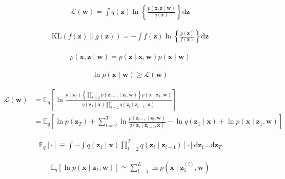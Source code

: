 \documentclass{article}
\begin{document}
\begin{align*}
\mathcal{L}(\mathbf{w})=\int q(\mathbf{z}) \ln \left\{\frac{p(\mathbf{x}, \mathbf{z} \mid \mathbf{w})}{q(\mathbf{z})}\right\} \mathrm{d} \mathbf{z} 
\tag{20.22}
\end{align*}

\begin{align*}
\mathrm{KL}(f(\mathbf{z}) \| g(\mathbf{z}))=-\int f(\mathbf{z}) \ln \left\{\frac{g(\mathbf{z})}{f(\mathbf{z})}\right\} \mathrm{d} \mathbf{z} 
\tag{20.23}
\end{align*}

\begin{align*}
p(\mathbf{x}, \mathbf{z} \mid \mathbf{w})=p(\mathbf{z} \mid \mathbf{x}, \mathbf{w}) p(\mathbf{x} \mid \mathbf{w}) 
\tag{20.24}
\end{align*}

\begin{align*}
\ln p(\mathbf{x} \mid \mathbf{w}) \geqslant \mathcal{L}(\mathbf{w}) 
\tag{20.25}
\end{align*}

\begin{align*}
\mathcal{L}(\mathbf{w}) &= \mathbb{E}_{q}\left[\ln \frac{p\left(\mathbf{z}_{T}\right)\left\{\prod_{t=2}^{T} p\left(\mathbf{z}_{t-1} \mid \mathbf{z}_{t}, \mathbf{w}\right)\right\} p\left(\mathbf{x} \mid \mathbf{z}_{1}, \mathbf{w}\right)}{q\left(\mathbf{z}_{1} \mid \mathbf{x}\right) \prod_{t=2}^{T} q\left(\mathbf{z}_{t} \mid \mathbf{z}_{t-1}, \mathbf{x}\right)}\right] \\
&=\mathbb{E}_{q}\left[\ln p\left(\mathbf{z}_{T}\right)+\sum_{t=2}^{T} \ln \frac{p\left(\mathbf{z}_{t-1} \mid \mathbf{z}_{t}, \mathbf{w}\right)}{q\left(\mathbf{z}_{t} \mid \mathbf{z}_{t-1}, \mathbf{x}\right)}-\ln q\left(\mathbf{z}_{1} \mid \mathbf{x}\right)+\ln p\left(\mathbf{x} \mid \mathbf{z}_{1}, \mathbf{w}\right)\right]
\tag{20.26}
\end{align*}

\begin{align*}
\mathbb{E}_{q}[
\cdot]
\equiv \int \cdots \int q\left(\mathbf{z}_{1} \mid \mathbf{x}\right) \prod_{t=2}^{T} q\left(\mathbf{z}_{t} \mid \mathbf{z}_{t-1}\right)[
\cdot]
\mathrm{d} \mathbf{z}_{1} \ldots \mathrm{d} \mathbf{z}_{T} 
\tag{20.27}
\end{align*}

\begin{align*}
\mathbb{E}_{q}\left[\ln p\left(\mathbf{x} \mid \mathbf{z}_{1}, \mathbf{w}\right)\right]
\simeq \sum_{l=1}^{L} \ln p\left(\mathbf{x} \mid \mathbf{z}_{1}^{(l)}, \mathbf{w}\right)
\tag{20.28}
\end{align*}
\end{document}
